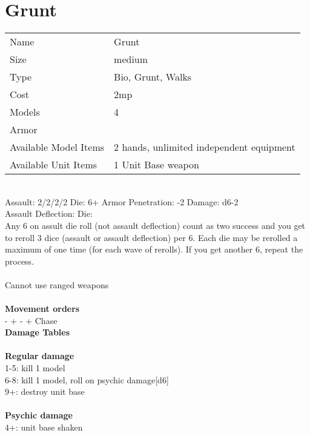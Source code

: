 \pagebreak

\section{ Grunt }

\begin{tabular}{ll}
  Name & Grunt \\
  Size & medium\\
  Type & Bio, Grunt, Walks\\
  Cost & 2mp\\
  Models & 4\\
  Armor & \\
  Available Model Items & 2 hands, unlimited independent equipment \\
  Available Unit Items & 1 Unit Base weapon \\
\end{tabular}

\ \\
Assault: 2/2/2/2 Die: 6+ Armor Penetration: -2 Damage: d6-2 \\
Assault Deflection:  Die: \\
\indent Any 6 on assult die roll (not assault deflection) count as two success and you get to reroll 3 dice (assault or assault deflection) per 6. Each die may be rerolled a maximum of one time (for each wave of rerolls). If you get another 6, repeat the process.  \\
\ \\
Cannot use ranged weapons
\ \\


\ \\ {\bf Movement orders } \\
- + - + Chase \\



{\bf Damage Tables} \\
\ \\ {\bf Regular damage } \\
1-5: kill 1 model \\
6-8: kill 1 model, roll on psychic damage[d6] \\
9+: destroy unit base \\
\ \\ {\bf Psychic damage } \\
4+: unit base shaken \\









